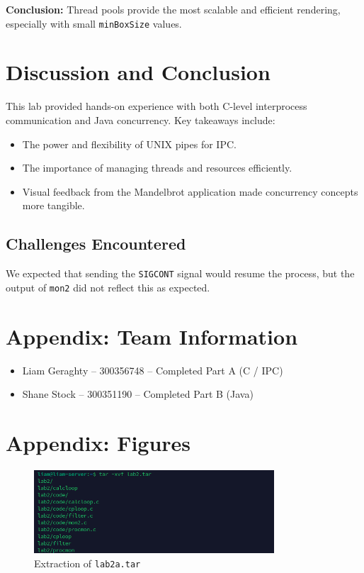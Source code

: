 \documentclass[a4paper,12pt]{article}
\begin{document}
\textbf{Conclusion:} Thread pools provide the most scalable and efficient rendering, especially with small \texttt{minBoxSize} values.

\section{Discussion and Conclusion}

This lab provided hands-on experience with both C-level interprocess communication and Java concurrency. Key takeaways include:
\begin{itemize}
    \item The power and flexibility of UNIX pipes for IPC.
    \item The importance of managing threads and resources efficiently.
    \item Visual feedback from the Mandelbrot application made concurrency concepts more tangible.
\end{itemize}

\subsection*{Challenges Encountered}
We expected that sending the \texttt{SIGCONT} signal would resume the process, but the output of \texttt{mon2} did not reflect this as expected.

\section*{Appendix: Team Information}
\begin{itemize}
  \item Liam Geraghty – 300356748 – Completed Part A (C / IPC)
  \item Shane Stock – 300351190 – Completed Part B (Java)
\end{itemize}

\newpage
\section*{Appendix: Figures}

\begin{figure}[H]
    \centering
    \includegraphics[width=0.8\textwidth]{lab2_extraction.png}
    \caption{Extraction of \texttt{lab2a.tar}}
    \label{fig:lab2_extract}
\end{figure}
\end{document}
